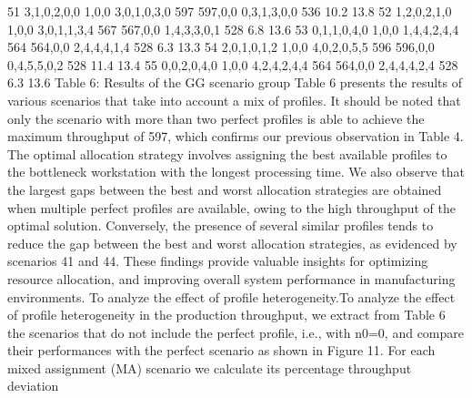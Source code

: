 	51	3,1,0,2,0,0	1,0,0	3,0,1,0,3,0	597	597,0,0	0,3,1,3,0,0	536	10.2	13.8
	52	1,2,0,2,1,0	1,0,0	3,0,1,1,3,4	567	567,0,0	1,4,3,3,0,1	528	6.8	13.6
	53	0,1,1,0,4,0	1,0,0	1,4,4,2,4,4	564	564,0,0	2,4,4,4,1,4	528	6.3	13.3
	54	2,0,1,0,1,2	1,0,0	4,0,2,0,5,5	596	596,0,0	0,4,5,5,0,2	528	11.4	13.4
	55	0,0,2,0,4,0	1,0,0	4,2,4,2,4,4	564	564,0,0	2,4,4,4,2,4	528	6.3	13.6
Table 6: Results of the GG scenario group
Table 6 presents the results of various scenarios that take into account a mix of profiles. It should be noted that only the scenario with more than two perfect profiles is able to achieve the maximum throughput of 597, which confirms our previous observation in Table 4. The optimal allocation strategy involves assigning the best available profiles to the bottleneck workstation with the longest processing time. We also observe that the largest gaps between the best and worst allocation strategies are obtained when multiple perfect profiles are available, owing to the high throughput of the optimal solution. Conversely, the presence of several similar profiles tends to reduce the gap between the best and worst allocation strategies, as evidenced by scenarios 41 and 44. These findings provide valuable insights for optimizing resource allocation, and improving overall system performance in manufacturing environments. To analyze the effect of profile heterogeneity.To analyze the effect of profile heterogeneity in the production throughput, we extract from Table 6 the scenarios that do not include the perfect profile, i.e., with n0=0, and compare their performances with the perfect scenario as shown in Figure 11. For each mixed assignment (MA) scenario we calculate its percentage throughput deviation %
 
